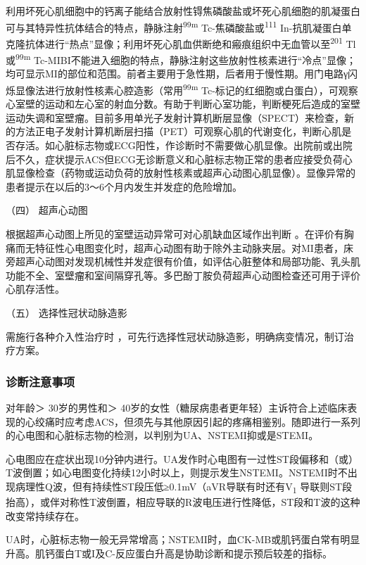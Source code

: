 利用坏死心肌细胞中的钙离子能结合放射性锝焦磷酸盐或坏死心肌细胞的肌凝蛋白可与其特异性抗体结合的特点，静脉注射\textsuperscript{99m}
Tc-焦磷酸盐或\textsuperscript{111}
In-抗肌凝蛋白单克隆抗体进行“热点”显像；利用坏死心肌血供断绝和瘢痕组织中无血管以至\textsuperscript{201}
Tl或\textsuperscript{99m}
Tc-MIBI不能进入细胞的特点，静脉注射这些放射性核素进行“冷点”显像；均可显示MI的部位和范围。前者主要用于急性期，后者用于慢性期。用门电路γ闪烁显像法进行放射性核素心腔造影（常用\textsuperscript{99m}
Tc-标记的红细胞或白蛋白），可观察心室壁的运动和左心室的射血分数。有助于判断心室功能，判断梗死后造成的室壁运动失调和室壁瘤。目前多用单光子发射计算机断层显像（SPECT）来检查，新的方法正电子发射计算机断层扫描（PET）可观察心肌的代谢变化，判断心肌是否存活。如心脏标志物或ECG阳性，作诊断时不需要做心肌显像。出院前或出院后不久，症状提示ACS但ECG无诊断意义和心脏标志物正常的患者应接受负荷心肌显像检查（药物或运动负荷的放射性核素或超声心动图心肌显像）。显像异常的患者提示在以后的3～6个月内发生并发症的危险增加。

\hypertarget{text00312.htmlux5cux23CHP10-8-2-2-2-4}{}
（四） 超声心动图

根据超声心动图上所见的室壁运动异常可对心肌缺血区域作出判断
。在评价有胸痛而无特征性心电图变化时，超声心动图有助于除外主动脉夹层。对MI患者，床旁超声心动图对发现机械性并发症很有价值，如评估心脏整体和局部功能、乳头肌功能不全、室壁瘤和室间隔穿孔等。多巴酚丁胺负荷超声心动图检查还可用于评价心肌存活性。

\hypertarget{text00312.htmlux5cux23CHP10-8-2-2-2-5}{}
（五） 选择性冠状动脉造影

需施行各种介入性治疗时
，可先行选择性冠状动脉造影，明确病变情况，制订治疗方案。

\subsubsection{诊断注意事项}

对年龄＞ 30岁的男性和＞
40岁的女性（糖尿病患者更年轻）主诉符合上述临床表现的心绞痛时应考虑ACS，但须先与其他原因引起的疼痛相鉴别。随即进行一系列的心电图和心脏标志物的检测，以判别为UA、NSTEMI抑或是STEMI。

心电图应在症状出现10分钟内进行。UA发作时心电图有一过性ST段偏移和（或）T波倒置；如心电图变化持续12小时以上，则提示发生NSTEMI。NSTEMI时不出现病理性Q波，但有持续性ST段压低≥0.1mV（aVR导联有时还有V\textsubscript{1}
导联则ST段抬高），或伴对称性T波倒置，相应导联的R波电压进行性降低，ST段和T波的这种改变常持续存在。

UA时，心脏标志物一般无异常增高；NSTEMI时，血CK-MB或肌钙蛋白常有明显升高。肌钙蛋白T或I及C-反应蛋白升高是协助诊断和提示预后较差的指标。

